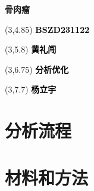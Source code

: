 \documentclass[
]{article}
\author{}
\date{\vspace{-2.5em}}
\begin{document}
\begin{titlepage} 
\begin{center} \textbf{\huge 骨肉瘤} \vspace{4em}
\begin{textblock}{10}(3,4.85) \Large
\textbf{\textcolor{black}{BSZD231122}}
\end{textblock} \begin{textblock}{10}(3,5.8)
\Large \textbf{\textcolor{black}{黄礼闯}}
\end{textblock} \begin{textblock}{10}(3,6.75)
\Large \textbf{\textcolor{black}{分析优化}}
\end{textblock} \begin{textblock}{10}(3,7.7)
\Large \textbf{\textcolor{black}{杨立宇}}
\end{textblock} \end{center} \end{titlepage}
\restoregeometry


\begin{center}\vspace{1.5cm}\end{center}\tableofcontents

\begin{center}\vspace{1.5cm}\end{center}\listoffigures

\begin{center}\vspace{1.5cm}\end{center}\listoftables

\newpage


\hypertarget{abstract}{%
\section{分析流程}\label{abstract}}

\hypertarget{introduction}{%
\section{材料和方法}\label{introduction}}
\end{document}
